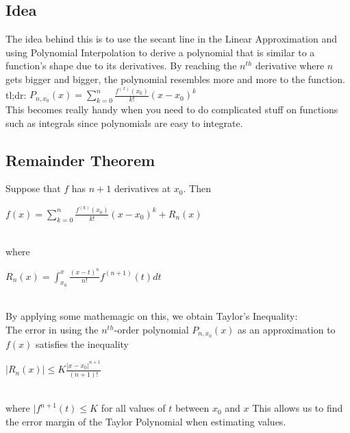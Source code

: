 \documentclass[12pt]{report}
\begin{document}
		\subsection{Idea}
			The idea behind this is to use the secant line in the Linear Approximation and using Polynomial Interpolation to derive a polynomial that is similar to a function's shape due to its derivatives. By reaching the $n^{th}$ derivative where $n$ gets bigger and bigger, the polynomial resembles more and more to the function.\\
			tl;dr: $P_{n,x_0}(x) = \sum_{k=0}^{n} \frac{f^{(x)}(x_0)}{k!}(x-x_0)^k$\\
			This becomes really handy when you need to do complicated stuff on functions such as integrals since polynomials are easy to integrate.
		\subsection{Remainder Theorem}
			Suppose that $f$ has $n+1$ derivatives at $x_0$. Then \\
			\centerline{$f(x) = \sum_{k=0}^{n} \frac{f^{(k)}(x_0)}{k!}(x-x_0)^k+R_n(x)$}\\
			where\\
			\centerline{$R_n(x) = \int_{x_0}^{x} \frac{(x-t)^n}{n!} f^{(n+1)}(t)dt$}\\
			By applying some mathemagic on this, we obtain Taylor's Inequality:\\
			The error in using the $n^{th}$-order polynomial $P_{n,x_0}(x)$ as an approximation to $f(x)$ satisfies the inequality \\
			\centerline{$|R_n(x)| \leq K \frac{|x-x_0|^{n+1}}{(n+1)!}$}\\
			where $|f^{n+1}(t) \leq K$ for all values of $t$ between $x_0$ and $x$
			This allows us to find the error margin of the Taylor Polynomial when estimating values. 
\end{document}
